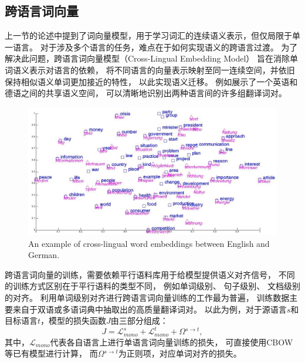 \subsection{跨语言词向量}
\label{sec:rw-linking-cle}

上一节的论述中提到了词向量模型，用于学习词汇的连续语义表示，但仅局限于单一语言。
对于涉及多个语言的任务，难点在于如何实现语义的跨语言过渡。
为了解决此问题，跨语言词向量模型（Cross-Lingual Embedding Model）
旨在消除单词语义表示对语言的依赖，
将不同语言的向量表示映射至同一连续空间，并依旧保持相似语义单词更加接近的特性，
以此实现语义迁移。
例如展示了一个英语和德语之间的共享语义空间，
可以清晰地识别出两种语言间的许多组翻译词对。

\begin{figure}[th]
	\centering
    \includegraphics[width=0.8\columnwidth]{figure/rw/linking-cle.jpg}
    {An example of cross-lingual word embeddings between English and German.}
	\label{fig:rw-linking-cle}
\end{figure}

跨语言词向量的训练，需要依赖平行语料库用于给模型提供语义对齐信号，
不同的训练方式区别在于平行语料的类型不同，
例如单词级别\cite{mikolov2013exploiting,klementiev2012inducing,lazaridou2015hubness}、
句子级别\cite{hermann2013multilingual,gouws2015bilbowa}、
文档级别\cite{vulic2016bilingual}的对齐。
利用单词级别对齐进行跨语言词向量训练的工作最为普遍，
训练数据主要来自于双语或多语词典中抽取出的高质量翻译词对。
以此为例，对于源语言$s$和目标语言$t$，模型的损失函数$J$由三部分组成：
\begin{equation}
  J = \mathcal{L}_{mono}^{s} + \mathcal{L}_{mono}^{t} + \Omega{}^{s \rightarrow t},
\end{equation}
\noindent
其中，$\mathcal{L}_{mono}$代表各自语言上进行单语言词向量训练的损失，
可直接使用CBOW等已有模型进行计算，
而$\Omega{}^{s \rightarrow t}$为正则项，对应单词对齐的损失。


